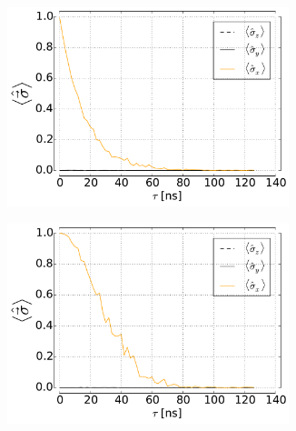 \documentclass[12pt]{report}
\numberwithin{equation}{section}
\begin{document}
\begin{figure}
\begingroup
\captionsetup[subfigure]{width=0.9\textwidth}
\centering
\begin{subfigure}[t]{0.45\textwidth}
\centering
\includegraphics[width=0.9\textwidth]{deph_white}
\end{subfigure}
\begin{subfigure}[t]{0.45\textwidth}
\centering
\includegraphics[width=0.9\textwidth]{deph_pink}
\end{subfigure}


\end{figure}
\end{document}
